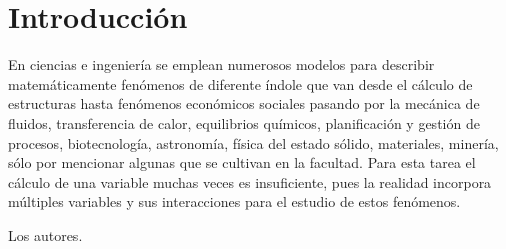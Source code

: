 \chapter*{Introducci\'on}

En ciencias e ingenier\'ia se emplean numerosos modelos para describir matem\'aticamente fen\'omenos de diferente \'indole que van desde el c\'alculo de estructuras hasta fen\'omenos econ\'omicos sociales pasando por la mec\'anica de fluidos, transferencia de calor, equilibrios qu\'imicos, planificaci\'on y gesti\'on de procesos, biotecnolog\'ia, astronom\'ia, f\'isica del estado s\'olido, materiales, miner\'ia, s\'olo por mencionar algunas que se cultivan en la facultad. Para esta tarea el c\'alculo de una variable muchas veces es insuficiente, pues la realidad incorpora m\'ultiples variables y sus interacciones para el estudio de estos fen\'omenos.

\begin{flushright}
Los autores.
\end{flushright}